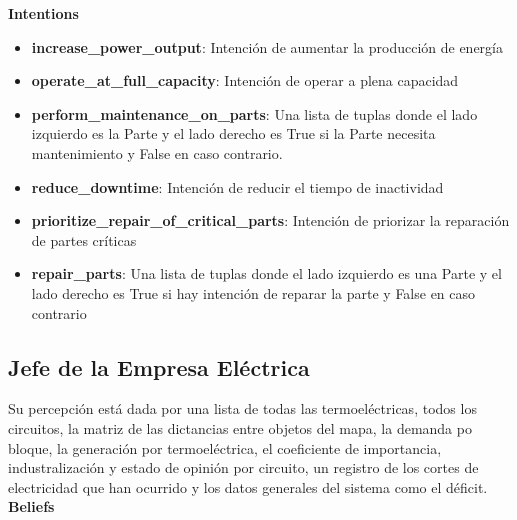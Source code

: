 \documentclass[twocolumn, fontsize=10pt]{article}
\begin{document}
\textbf{Intentions}

\begin{itemize}
  \item \textbf{increase\_power\_output}: Intención de aumentar la producción de energía
  \item \textbf{operate\_at\_full\_capacity}: Intención de operar a plena capacidad
  \item \textbf{perform\_maintenance\_on\_parts}: Una lista de tuplas donde el lado izquierdo es la Parte y el lado derecho es True si la Parte necesita mantenimiento y False en caso contrario.
  \item \textbf{reduce\_downtime}: Intención de reducir el tiempo de inactividad
  \item \textbf{prioritize\_repair\_of\_critical\_parts}: Intención de priorizar la reparación de partes críticas
  \item \textbf{repair\_parts}: Una lista de tuplas donde el lado izquierdo es una Parte y el lado derecho es True si hay intención de reparar la parte y False en caso contrario

\end{itemize}

\subsection{Jefe de la Empresa Eléctrica}

Su percepción está  dada por una lista de todas las termoeléctricas, todos los circuitos, la matriz de las dictancias entre objetos del mapa, la demanda po bloque, la generación por termoeléctrica, el coeficiente de importancia, industralización y estado de opinión por circuito, un registro de los cortes de electricidad que han ocurrido y los datos generales del sistema como el déficit. \\

\textbf{Beliefs}
\end{document}

